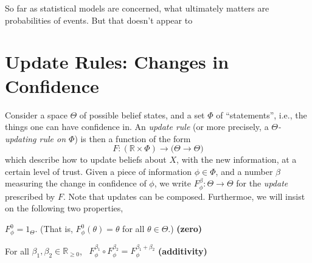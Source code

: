 \documentclass{article}
\begin{document}
    So far as statistical models are concerned, what ultimately matters are probabilities of events.
    But that doesn't appear to

\section{Update Rules: Changes in Confidence}
\def\X{\mathcal X}


Consider a space $\Theta$
of possible belief states,
and a set $\Phi$ of ``statements'', i.e., the things one can have confidence in.
An \emph{update rule}
(or more precisely, a \emph{$\Theta$-updating rule on $\Phi$})
is then a function of the form
\[
    F :  (\mathbb R \times \Phi) \to \Big( \Theta \to \Theta \Big)
\]
which describe how to update beliefs about $X$, with the new information, at a certain level of trust.
Given a piece of information $\phi \in \Phi$, and a number $\beta$ measuring the change in confidence of $\phi$, we write
$F^\beta_\phi : \Theta \to \Theta$
for the \emph{update} prescribed by $F$.
Note that updates can be composed.
Furthermoe, we will insist on the following two properties,
\begin{URaxioms}
    \item  $F^{0}_\phi  = 1_{\Theta}$.
        (That is, $F^{0}_\phi(\theta) = \theta$ for all $\theta \in \Theta$.)
        \hfill \textbf{(zero)} \label{ax:zero}
    \item For all $\beta_1, \beta_2 \in \mathbb R_{\ge 0}$,~
        $F^{\beta_1}_\phi \circ F^{\beta_2}_\phi = F^{\beta_1 + \beta_2}_\phi$
        \hfill \textbf{(additivity)} \label{ax:additivity}
\end{URaxioms}
\end{document}
